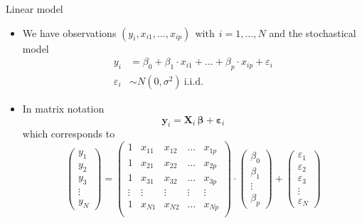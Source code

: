 \documentclass[aspectratio=169]{beamer}
\newcommand{\vect}[1]{\mathbf{#1}}
\newcommand{\mat}[1]{\mathbf{#1}}
\newcommand{\gvect}[1]{\boldsymbol{#1}}
\begin{document}
\begin{frame}{Linear model}
  \begin{itemize}
    \item We have observations $(y_i, x_{i1}, \ldots, x_{ip}) ~~\text{with}~~ i = 1, \ldots, N$
and the stochastical model
\begin{align*}
  y_i & = \beta_0 + \beta_1 \cdot x_{i1} + \ldots + \beta_p \cdot x_{ip} +
        \varepsilon_i \\
  \varepsilon_i & \sim N (0, \sigma^2)~\text{i.i.d.}
\end{align*}

\vspace{-.4cm}
\item In matrix notation
\[
  \vect{y}_i = \mat{X}_i \, \gvect{\beta} + \gvect{\varepsilon}_i
\]
which corresponds to
\[
  \begin{pmatrix}
    y_1 \\
    y_2 \\
    y_3 \\
    \vdots \\
    y_N
  \end{pmatrix} = 
  \begin{pmatrix}
    1 & x_{11} & x_{12} & \dots & x_{1p} \\
    1 & x_{21} & x_{22} & \dots & x_{2p} \\
    1 & x_{31} & x_{32} & \dots & x_{3p} \\
    \vdots & \vdots & \vdots & \vdots & \vdots \\
    1 & x_{N1} & x_{N2} & \dots & x_{Np} \\
  \end{pmatrix} \cdot
  \begin{pmatrix}
    \beta_0 \\
    \beta_1 \\
    \vdots \\
    \beta_p
  \end{pmatrix} +
  \begin{pmatrix}
    \varepsilon_1 \\
    \varepsilon_2 \\
    \varepsilon_3 \\
    \vdots \\
    \varepsilon_N
  \end{pmatrix}
\]
  \end{itemize}
\end{frame}
\end{document}
